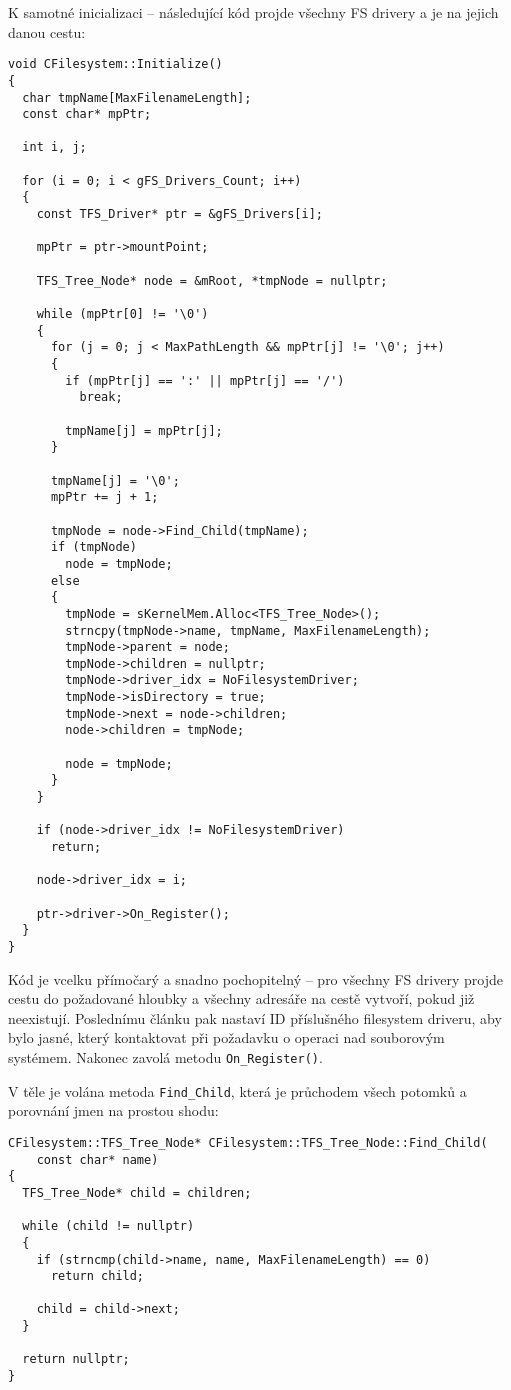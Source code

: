\documentclass{article}
\begin{document}
K samotné inicializaci -- následující kód projde všechny FS drivery a  je na jejich danou cestu:
\begin{lstlisting}
void CFilesystem::Initialize()
{
  char tmpName[MaxFilenameLength];
  const char* mpPtr;

  int i, j;

  for (i = 0; i < gFS_Drivers_Count; i++)
  {
    const TFS_Driver* ptr = &gFS_Drivers[i];

    mpPtr = ptr->mountPoint;

    TFS_Tree_Node* node = &mRoot, *tmpNode = nullptr;

    while (mpPtr[0] != '\0')
    {
      for (j = 0; j < MaxPathLength && mpPtr[j] != '\0'; j++)
      {
        if (mpPtr[j] == ':' || mpPtr[j] == '/')
          break;
				
        tmpName[j] = mpPtr[j];
      }

      tmpName[j] = '\0';
      mpPtr += j + 1;
			
      tmpNode = node->Find_Child(tmpName);
      if (tmpNode)
        node = tmpNode;
      else
      {
        tmpNode = sKernelMem.Alloc<TFS_Tree_Node>();
        strncpy(tmpNode->name, tmpName, MaxFilenameLength);
        tmpNode->parent = node;
        tmpNode->children = nullptr;
        tmpNode->driver_idx = NoFilesystemDriver;
        tmpNode->isDirectory = true;
        tmpNode->next = node->children;
        node->children = tmpNode;

        node = tmpNode;
      }
    }
		
    if (node->driver_idx != NoFilesystemDriver)
      return;

    node->driver_idx = i;

    ptr->driver->On_Register();
  }
}
\end{lstlisting}
Kód je vcelku přímočarý a snadno pochopitelný -- pro všechny FS drivery projde cestu do požadované hloubky a všechny adresáře na cestě vytvoří, pokud již neexistují. Poslednímu článku pak nastaví ID příslušného filesystem driveru, aby bylo jasné, který kontaktovat při požadavku o operaci nad souborovým systémem. Nakonec zavolá metodu \texttt{On\_Register()}.

V těle je volána metoda \texttt{Find\_Child}, která je průchodem všech potomků a porovnání jmen na prostou shodu:
\begin{lstlisting}
CFilesystem::TFS_Tree_Node* CFilesystem::TFS_Tree_Node::Find_Child(
    const char* name)
{
  TFS_Tree_Node* child = children;
	
  while (child != nullptr)
  {
    if (strncmp(child->name, name, MaxFilenameLength) == 0)
      return child;

    child = child->next;
  }
	
  return nullptr;
}
\end{lstlisting}
\end{document}
